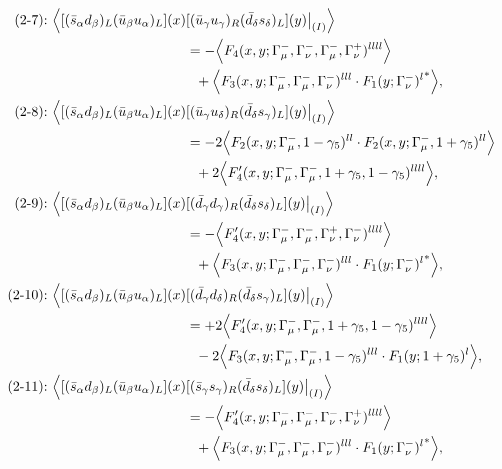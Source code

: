 \begin{align}
\\
\mbox{(2-7):}\ 
\Big\langle
[(\bar s_\alpha d_\beta)_L(\bar u_\beta u_\alpha)_L](x)&
[(\bar u_\gamma u_\gamma)_R(\bar d_\delta s_\delta)_L](y)\big|_{(I)}
\Big\rangle
\notag\\*
&=
 - \Big\langle F_4(x,y;\Gamma_\mu^-,\Gamma_\nu^-,\Gamma_\mu^-,\Gamma_\nu^+)^{llll}\Big\rangle
\notag\\*&\ \ 
 + \Big\langle F_3(x,y;\Gamma_\mu^-,\Gamma_\mu^-,\Gamma_\nu^-)^{lll} \cdot {F_1(y;\Gamma_\nu^-)^l}^*\Big\rangle,
\\
\mbox{(2-8):}\ 
\Big\langle
[(\bar s_\alpha d_\beta)_L(\bar u_\beta u_\alpha)_L](x)&
[(\bar u_\gamma u_\delta)_R(\bar d_\delta s_\gamma)_L](y)\big|_{(I)}
\Big\rangle
\notag\\*
&=
-2\Big\langle F_2(x,y;\Gamma_\mu^-,1-\gamma_5)^{ll} \cdot F_2(x,y;\Gamma_\mu^-,1+\gamma_5)^{ll}\Big\rangle
\notag\\*&\ \ 
 + 2\Big\langle F_4'(x,y;\Gamma_\mu^-,\Gamma_\mu^-,1+\gamma_5,1-\gamma_5)^{llll}\Big\rangle,
\\
\mbox{(2-9):}\ 
\Big\langle
[(\bar s_\alpha d_\beta)_L(\bar u_\beta u_\alpha)_L](x)&
[(\bar d_\gamma d_\gamma)_R(\bar d_\delta s_\delta)_L](y)\big|_{(I)}
\Big\rangle
\notag\\*
&=
 - \Big\langle F_4'(x,y;\Gamma_\mu^-,\Gamma_\mu^-,\Gamma_\nu^+,\Gamma_\nu^-)^{llll}\Big\rangle
\notag\\*&\ \ 
 + \Big\langle F_3(x,y;\Gamma_\mu^-,\Gamma_\mu^-,\Gamma_\nu^-)^{lll} \cdot {F_1(y;\Gamma_\nu^-)^l}^*\Big\rangle,
\\
\mbox{(2-10):}\ 
\Big\langle
[(\bar s_\alpha d_\beta)_L(\bar u_\beta u_\alpha)_L](x)&
[(\bar d_\gamma d_\delta)_R(\bar d_\delta s_\gamma)_L](y)\big|_{(I)}
\Big\rangle
\notag\\*
&=
 + 2\Big\langle F_4'(x,y;\Gamma_\mu^-,\Gamma_\mu^-,1+\gamma_5,1-\gamma_5)^{llll}\Big\rangle
\notag\\*&\ \ 
-2\Big\langle F_3(x,y;\Gamma_\mu^-,\Gamma_\mu^-,1-\gamma_5)^{lll} \cdot F_1(y;1+\gamma_5)^l\Big\rangle,
\\
\mbox{(2-11):}\ 
\Big\langle
[(\bar s_\alpha d_\beta)_L(\bar u_\beta u_\alpha)_L](x)&
[(\bar s_\gamma s_\gamma)_R(\bar d_\delta s_\delta)_L](y)\big|_{(I)}
\Big\rangle
\notag\\*
&=
 - \Big\langle F_4'(x,y;\Gamma_\mu^-,\Gamma_\mu^-,\Gamma_\nu^-,\Gamma_\nu^+)^{llll}\Big\rangle
\notag\\*&\ \ 
 + \Big\langle F_3(x,y;\Gamma_\mu^-,\Gamma_\mu^-,\Gamma_\nu^-)^{lll} \cdot {F_1(y;\Gamma_\nu^-)^l}^*\Big\rangle,

\end{align}

